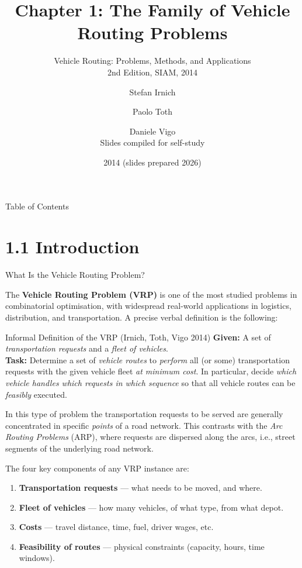\documentclass[aspectratio=169,10pt]{beamer}
\title[The Family of VRP]{%
  Chapter 1: The Family of Vehicle Routing Problems}
\subtitle{Vehicle Routing: Problems, Methods, and Applications\\
          2nd Edition, SIAM, 2014}
\author{Stefan Irnich \and Paolo Toth \and Daniele Vigo\\[4pt]
  \small Slides compiled for self-study}
\date{2014 (slides prepared 2026)}
\begin{document}

\begin{frame}
  \titlepage
\end{frame}

\begin{frame}[allowframebreaks]{Table of Contents}
  \tableofcontents
\end{frame}

\section{1.1 Introduction}

\begin{frame}[allowframebreaks]{What Is the Vehicle Routing Problem?}

The \textbf{Vehicle Routing Problem (VRP)} is one of the most studied problems in
combinatorial optimisation, with widespread real-world applications in logistics,
distribution, and transportation.  A precise verbal definition is the following:

\begin{block}{Informal Definition of the VRP (Irnich, Toth, Vigo 2014)}
\textbf{Given:} A set of \emph{transportation requests} and a \emph{fleet of vehicles}.\\[4pt]
\textbf{Task:} Determine a set of \emph{vehicle routes} to \emph{perform} all (or some)
transportation requests with the given vehicle fleet \emph{at minimum cost}.  In
particular, decide \emph{which vehicle handles which requests in which sequence} so that
all vehicle routes can be \emph{feasibly} executed.
\end{block}

In this type of problem the transportation requests to be served are generally
concentrated in specific \emph{points} of a road network.  This contrasts with the
\emph{Arc Routing Problems} (ARP), where requests are dispersed along the arcs, i.e.,
street segments of the underlying road network.

\medskip
The four key components of any VRP instance are:
\begin{enumerate}
  \item \textbf{Transportation requests} --- what needs to be moved, and where.
  \item \textbf{Fleet of vehicles} --- how many vehicles, of what type, from what depot.
  \item \textbf{Costs} --- travel distance, time, fuel, driver wages, etc.
  \item \textbf{Feasibility of routes} --- physical constraints (capacity, hours, time windows).
\end{enumerate}


\end{frame}
\end{document}
